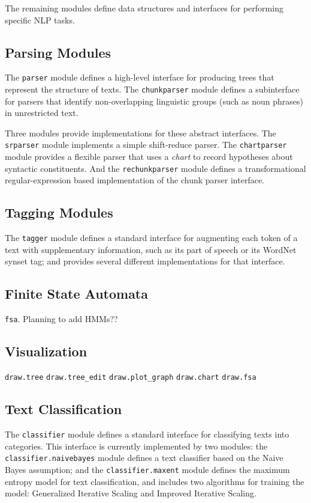 \documentclass[11pt]{article}
\begin{document}
The remaining modules define data structures and interfaces for
performing specific NLP tasks.

\subsection*{Parsing Modules}

The \texttt{parser} module defines a high-level interface for
producing trees that represent the structure of texts.  The
\texttt{chunkparser} module defines a subinterface for parsers that
identify non-overlapping linguistic groups (such as noun phrases) in
unrestricted text.  

Three modules provide implementations for these abstract interfaces.
The \texttt{srparser} module implements a simple shift-reduce parser.
The \texttt{chartparser} module provides a flexible parser that uses a
\emph{chart} to record hypotheses about syntactic constituents.  And
the \texttt{rechunkparser} module defines a transformational
regular-expression based implementation of the chunk parser interface.

\subsection*{Tagging Modules}

The \texttt{tagger} module defines a standard interface for augmenting
each token of a text with supplementary information, such as its part
of speech or its WordNet synset tag; and provides several
different implementations for that interface.

\subsection*{Finite State Automata}

\texttt{fsa}.  Planning to add HMMs??

\subsection*{Visualization}

\texttt{draw.tree}
\texttt{draw.tree\_edit}
\texttt{draw.plot\_graph}
\texttt{draw.chart}
\texttt{draw.fsa}

\subsection*{Text Classification}

The \texttt{classifier} module defines a standard interface for
classifying texts into categories.  This interface is currently
implemented by two modules: the \texttt{classifier.naivebayes} module
defines a text classifier based on the Naive Bayes assumption; and the
\texttt{classifier.maxent} module defines the maximum entropy model
for text classification, and includes two algorithms for training the
model: Generalized Iterative Scaling and Improved Iterative Scaling.
\end{document}
